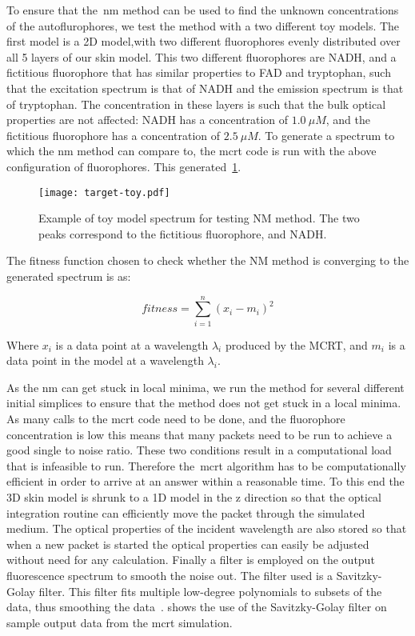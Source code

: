 To ensure that the~\gls*{nm} method can be used to find the unknown concentrations of the autoflurophores, we test the method with a two different toy models.
The first model is a 2D model,with two different fluorophores evenly distributed over all 5 layers of our skin model. 
This two different fluorophores are NADH, and a fictitious fluorophore that has similar properties to FAD and tryptophan, such that the excitation spectrum is that of NADH and the emission spectrum is that of tryptophan.
The concentration in these layers is such that the bulk optical properties are not affected: NADH has a concentration of $1.0~\mu M$, and the fictitious fluorophore has a concentration of $2.5~\mu M$.
To generate a spectrum to which the \gls*{nm} method can compare to, the \gls*{mcrt} code is run with the above configuration of fluorophores.
This generated~\cref{fig:toymodelspectra}.


\begin{figure}[!htbp]
  \centering
  \texttt{[image: target-toy.pdf]}
  \caption{Example of toy model spectrum for testing NM method. The two peaks correspond to the fictitious fluorophore, and NADH.}
  \label{fig:toymodelspectra}
\end{figure}

The fitness function chosen to check whether the NM method is converging to the generated spectrum is as:

\begin{equation}
fitness = \sum\limits_{i=1}^{n}(x_i-m_i)^2
\end{equation}

Where $x_i$ is a data point at a wavelength $\lambda_i$ produced by the MCRT, and $m_i$ is a data point in the model at a wavelength $\lambda_i$.

As the \gls*{nm} can get stuck in local minima, we run the method for several different initial simplices to ensure that the method does not get stuck in a local minima.
As many calls to the \gls*{mcrt} code need to be done, and the fluorophore concentration is low this means that many packets need to be run to achieve a good single to noise ratio.
These two conditions result in a computational load that is infeasible to run. 
Therefore the~\gls*{mcrt} algorithm has to be computationally efficient in order to arrive at an answer within a reasonable time.
To this end the 3D skin model is shrunk to a 1D model in the z direction so that the optical integration routine can efficiently move the packet through the simulated medium.
The optical properties of the incident wavelength are also stored so that when a new packet is started the optical properties can easily be adjusted without need for any calculation.
Finally a filter is employed on the output fluorescence spectrum to smooth the noise out.
The filter used is a Savitzky-Golay filter.
This filter fits multiple low-degree polynomials to subsets of the data, thus smoothing the data~\cite{press1990savitzky}. 
 shows the use of the Savitzky-Golay filter on sample output data from the \gls*{mcrt} simulation.

